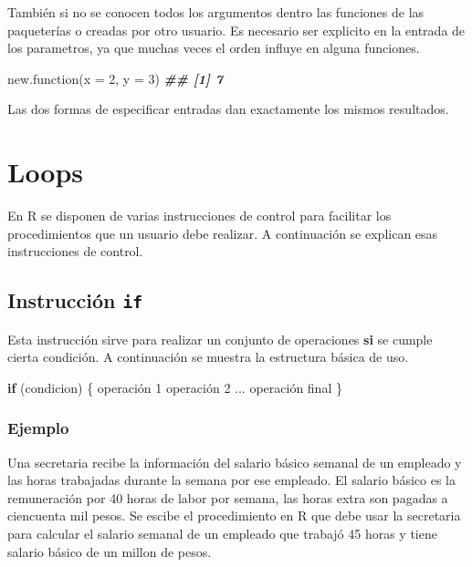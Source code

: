 \documentclass[
]{book}
\newenvironment{Shaded}{\begin{snugshade}}{\end{snugshade}}
\newcommand{\AttributeTok}[1]{\textcolor[rgb]{0.77,0.63,0.00}{#1}}
\newcommand{\ControlFlowTok}[1]{\textcolor[rgb]{0.13,0.29,0.53}{\textbf{#1}}}
\newcommand{\DecValTok}[1]{\textcolor[rgb]{0.00,0.00,0.81}{#1}}
\newcommand{\DocumentationTok}[1]{\textcolor[rgb]{0.56,0.35,0.01}{\textbf{\textit{#1}}}}
\newcommand{\FunctionTok}[1]{\textcolor[rgb]{0.00,0.00,0.00}{#1}}
\newcommand{\NormalTok}[1]{#1}
\begin{document}
También si no se conocen todos los argumentos dentro las funciones de las paqueterías o creadas por otro usuario. Es necesario ser explicito en la entrada de los parametros, ya que muchas veces el orden influye en alguna funciones.

\begin{Shaded}
\begin{Highlighting}[]
\FunctionTok{new.function}\NormalTok{(}\AttributeTok{x =} \DecValTok{2}\NormalTok{, }\AttributeTok{y =} \DecValTok{3}\NormalTok{)}
\DocumentationTok{\#\# [1] 7}
\end{Highlighting}
\end{Shaded}

Las dos formas de especificar entradas dan exactamente los mismos resultados.

\hypertarget{loops}{%
\chapter{Loops}\label{loops}}

En R se disponen de varias instrucciones de control para facilitar los procedimientos que un usuario debe realizar. A continuación se explican esas instrucciones de control.

\hypertarget{instrucciuxf3n-if}{%
\section{\texorpdfstring{Instrucción \texttt{if}}{Instrucción if}}\label{instrucciuxf3n-if}}

Esta instrucción sirve para realizar un conjunto de operaciones \textbf{si} se cumple cierta condición. A continuación se muestra la estructura básica de uso.

\begin{Shaded}
\begin{Highlighting}[]
\ControlFlowTok{if}\NormalTok{ (condicion) \{}
\NormalTok{  operación }\DecValTok{1}
\NormalTok{  operación }\DecValTok{2}
\NormalTok{  ...}
\NormalTok{  operación final}
\NormalTok{\}}
\end{Highlighting}
\end{Shaded}

\hypertarget{ejemplo-15}{%
\subsection*{Ejemplo}\label{ejemplo-15}}

Una secretaria recibe la información del salario básico semanal de un empleado y las horas trabajadas durante la semana por ese empleado. El salario básico es la remuneración por 40 horas de labor por semana, las horas extra son pagadas a ciencuenta mil pesos. Se escibe el procedimiento en R que debe usar la secretaria para calcular el salario semanal de un empleado que trabajó 45 horas y tiene salario básico de un millon de pesos.
\end{document}
